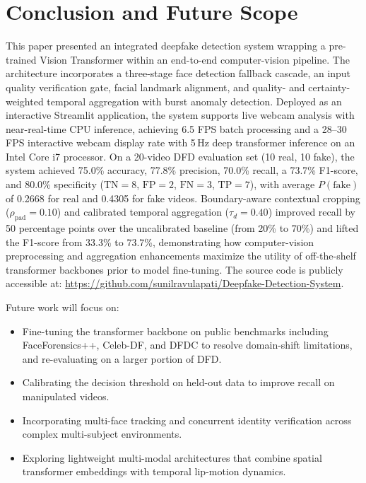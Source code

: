 \documentclass[conference]{IEEEtran}
\begin{document}
\section{Conclusion and Future Scope}
This paper presented an integrated deepfake detection system wrapping a pre-trained Vision Transformer within an end-to-end computer-vision pipeline. The architecture incorporates a three-stage face detection fallback cascade, an input quality verification gate, facial landmark alignment, and quality- and certainty-weighted temporal aggregation with burst anomaly detection. Deployed as an interactive Streamlit application, the system supports live webcam analysis with near-real-time CPU inference, achieving 6.5 FPS batch processing and a 28--30 FPS interactive webcam display rate with 5\,Hz deep transformer inference on an Intel Core i7 processor. On a 20-video DFD evaluation set (10 real, 10 fake), the system achieved 75.0\% accuracy, 77.8\% precision, 70.0\% recall, a 73.7\% F1-score, and 80.0\% specificity ($\mathrm{TN}=8$, $\mathrm{FP}=2$, $\mathrm{FN}=3$, $\mathrm{TP}=7$), with average $P(\text{fake})$ of 0.2668 for real and 0.4305 for fake videos. Boundary-aware contextual cropping ($\rho_{\text{pad}} = 0.10$) and calibrated temporal aggregation ($\tau_d = 0.40$) improved recall by 50 percentage points over the uncalibrated baseline (from 20\% to 70\%) and lifted the F1-score from 33.3\% to 73.7\%, demonstrating how computer-vision preprocessing and aggregation enhancements maximize the utility of off-the-shelf transformer backbones prior to model fine-tuning. The source code is publicly accessible at: \url{https://github.com/sunilravulapati/Deepfake-Detection-System}.

Future work will focus on:
\begin{itemize}
\item Fine-tuning the transformer backbone on public benchmarks including FaceForensics++, Celeb-DF, and DFDC to resolve domain-shift limitations, and re-evaluating on a larger portion of DFD.
\item Calibrating the decision threshold on held-out data to improve recall on manipulated videos.
\item Incorporating multi-face tracking and concurrent identity verification across complex multi-subject environments.
\item Exploring lightweight multi-modal architectures that combine spatial transformer embeddings with temporal lip-motion dynamics.
\end{itemize}
\end{document}
